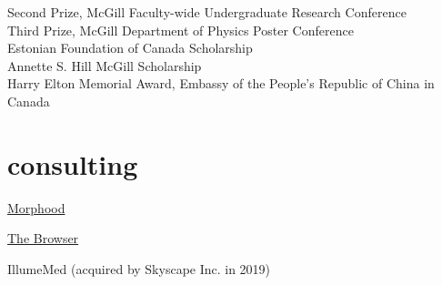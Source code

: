 \documentclass[4pt, letterpaper]{article}
\begin{document}
Second Prize, {McGill Faculty-wide Undergraduate Research Conference} \\%
Third Prize, McGill Department of Physics Poster Conference\\%
Estonian Foundation of Canada Scholarship\\%
Annette S. Hill McGill Scholarship\\%
Harry Elton Memorial Award, Embassy of the People's Republic of China in Canada%

\section*{consulting}



 \href{https://www.morphood.com}{Morphood}

 \href{https://thebrowser.com/}{The Browser}


 IllumeMed (acquired by Skyscape Inc. in 2019)
\end{document}

